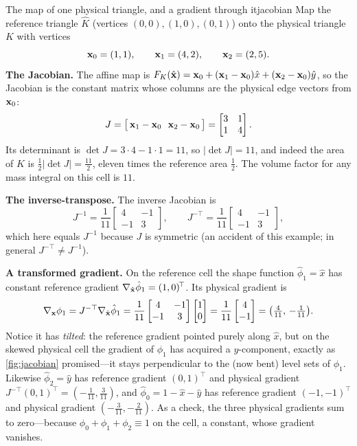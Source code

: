 \begin{workedexample}{The map of one physical triangle, and a gradient through it}{jacobian}
Map the reference triangle $\hat K$ (vertices $(0,0),(1,0),(0,1)$) onto the physical
triangle $K$ with vertices
\[
  \mathbf{x}_0 = (1,1), \qquad \mathbf{x}_1 = (4,2), \qquad \mathbf{x}_2 = (2,5).
\]
\textbf{The Jacobian.} The affine map is
$F_K(\hat{\mathbf{x}}) = \mathbf{x}_0 + (\mathbf{x}_1-\mathbf{x}_0)\hat x + (\mathbf{x}_2-\mathbf{x}_0)\hat y$, so the Jacobian is
the constant matrix whose columns are the physical edge vectors from $\mathbf{x}_0$:
\[
  J = \bigl[\,\mathbf{x}_1-\mathbf{x}_0 \ \ \mathbf{x}_2-\mathbf{x}_0\,\bigr]
    = \begin{bmatrix} 3 & 1 \\ 1 & 4 \end{bmatrix}.
\]
Its determinant is $\det J = 3\cdot 4 - 1\cdot 1 = 11$, so $|\det J| = 11$, and indeed
the area of $K$ is $\tfrac12|\det J| = \tfrac{11}{2}$, eleven times the reference
area $\tfrac12$. The volume factor for any mass integral on this cell is $11$.

\smallskip\noindent\textbf{The inverse-transpose.} The inverse Jacobian is
\[
  J^{-1} = \frac{1}{11}\begin{bmatrix} 4 & -1 \\ -1 & 3 \end{bmatrix},
  \qquad
  J^{-\top} = \frac{1}{11}\begin{bmatrix} 4 & -1 \\ -1 & 3 \end{bmatrix},
\]
which here equals $J^{-1}$ because $J$ is symmetric (an accident of this example;
in general $J^{-\top}\ne J^{-1}$).

\smallskip\noindent\textbf{A transformed gradient.} On the reference cell the shape
function $\hat\phi_1=\hat x$ has constant reference gradient
$\nabla_{\hat{\mathbf{x}}}\hat\phi_1 = (1,0)^{\!\top}$. Its physical gradient is
\[
  \nabla_{\mathbf{x}}\phi_1 = J^{-\top}\nabla_{\hat{\mathbf{x}}}\hat\phi_1
  = \frac{1}{11}\begin{bmatrix} 4 & -1 \\ -1 & 3 \end{bmatrix}
    \begin{bmatrix} 1 \\ 0 \end{bmatrix}
  = \frac{1}{11}\begin{bmatrix} 4 \\ -1 \end{bmatrix}
  = \bigl(\tfrac{4}{11},\,-\tfrac{1}{11}\bigr).
\]
Notice it has \emph{tilted}: the reference gradient pointed purely along $\hat x$, but
on the skewed physical cell the gradient of $\phi_1$ has acquired a $y$-component,
exactly as \cref{fig:jacobian} promised---it stays perpendicular to the (now bent)
level sets of $\phi_1$. Likewise $\hat\phi_2=\hat y$ has reference gradient
$(0,1)^{\!\top}$ and physical gradient
$J^{-\top}(0,1)^{\!\top}=(-\tfrac{1}{11},\tfrac{3}{11})$, and
$\hat\phi_0=1-\hat x-\hat y$ has reference gradient $(-1,-1)^{\!\top}$ and physical
gradient $(-\tfrac{3}{11},-\tfrac{2}{11})$. As a check, the three physical gradients
sum to zero---because $\phi_0+\phi_1+\phi_2\equiv 1$ on the cell, a constant, whose
gradient vanishes.


\end{workedexample}
